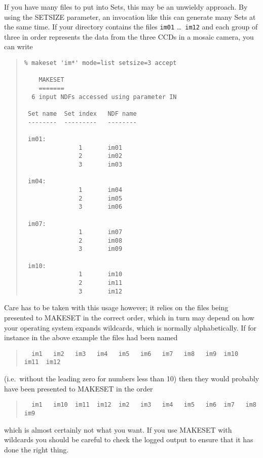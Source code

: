 \documentclass[twoside,11pt]{article}
\newcommand{\latexhtml}[2]{#1}
\renewcommand{\_}{\texttt{\symbol{95}}}
\newcommand{\ttsize}{\latexhtml{\small}{}}
\newenvironment{myquote}{\begin{quote}\ttsize}{\end{quote}}
\newcommand{\text}[1]{{\ttsize \tt #1}}
\newcommand{\routine}[1]{{\sc #1}}
\begin{document}
If you have many files to put into Sets, this may be an unwieldy
approach.  By using the SETSIZE parameter, an invocation like this
can generate many Sets at the same time.  If your directory contains
the files \text{im01} \ldots\ \text{im12} and each group of three in
order represents the data from the three CCDs in a mosaic camera,
you can write
\begin{myquote}
\begin{verbatim}
% makeset 'im*' mode=list setsize=3 accept

    MAKESET
    =======
  6 input NDFs accessed using parameter IN

 Set name  Set index   NDF name
 --------  ---------   --------

 im01:
               1       im01
               2       im02
               3       im03

 im04:
               1       im04
               2       im05
               3       im06

 im07:
               1       im07
               2       im08
               3       im09

 im10:
               1       im10
               2       im11
               3       im12
\end{verbatim}
\end{myquote}
Care has to be taken with this usage however; it relies on the
files being presented to \routine{MAKESET} in the correct order,
which in turn may depend on how your operating system expands
wildcards, which is normally alphabetically.  
If for instance in the above example the files had been named
\begin{myquote}
\begin{verbatim}
  im1   im2   im3   im4   im5   im6   im7   im8   im9  im10  im11  im12
\end{verbatim}
\end{myquote}
(i.e.\ without the leading zero for numbers less than 10) 
then they would probably have been presented to \routine{MAKESET} 
in the order
\begin{myquote}
\begin{verbatim} 
  im1   im10  im11  im12  im2   im3   im4   im5   im6  im7   im8   im9 
\end{verbatim}
\end{myquote}
which is almost certainly not what you want.
If you use \routine{MAKESET} with wildcards you should be careful
to check the logged output to ensure that it has done the right thing.
\end{document}
